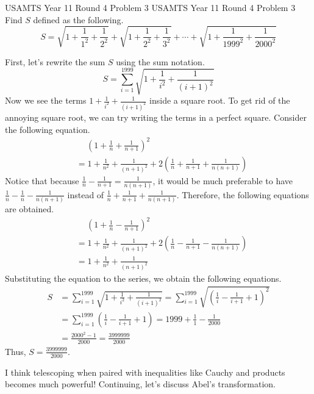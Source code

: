 \documentclass[../../../main.tex]{subfiles}
\begin{document}
\begin{problem}
{USAMTS Year 11 Round 4 Problem 3 \easy}
{USAMTS Year 11 Round 4 Problem 3}
Find $S$ defined as the following.
\[
S
= \sqrt{ 1 + \frac{1}{1^2} + \frac{1}{2^2} }
    + \sqrt{ 1 + \frac{1}{2^2} + \frac{1}{3^2} } + \cdots
    + \sqrt{ 1 + \frac{1}{1999^2} + \frac{1}{2000^2} }
\]
\end{problem}
\begin{solution}
First, let's rewrite the sum $S$ using the sum notation.
\[
S
= \sum_{i=1}^{1999}
    \sqrt{ 1 + \frac{1}{i^2} + \frac{1}{(i + 1)^2} }
\]
Now we see the terms $1 + \frac{1}{i^2} + \frac{1}{(i + 1)^2}$
inside a square root. To get rid of the annoying square root,
we can try writing the terms in a perfect square. Consider the
following equation.
\begin{align*}
    &\quad\ \left( 1 + \frac{1}{n} + \frac{1}{n + 1} \right)^2 \\
    &= 1 + \frac{1}{n^2} + \frac{1}{(n + 1)^2} + 2 \left(
        \frac{1}{n} + \frac{1}{n + 1} + \frac{1}{n(n + 1)}
    \right)
\end{align*}
Notice that because $\frac{1}{n} - \frac{1}{n+1} = \frac{1}{n(n+1)}$,
it would be much preferable to have $\frac{1}{n} - \frac{1}{n}
- \frac{1}{n(n+1)}$ instead of $\frac{1}{n} + \frac{1}{n + 1} +
\frac{1}{n(n + 1)}$. Therefore, the following equations are obtained.
\begin{align*}
    &\quad\ \left( 1 + \frac{1}{n} - \frac{1}{n + 1} \right)^2 \\
    &= 1 + \frac{1}{n^2} + \frac{1}{(n + 1)^2} + 2 \left(
        \frac{1}{n} - \frac{1}{n + 1} - \frac{1}{n(n + 1)}
    \right) \\
    &= 1 + \frac{1}{n^2} + \frac{1}{(n + 1)^2}
\end{align*}
Substituting the equation to the series, we obtain the following
equations.
\begin{align*}
    S
    &= \sum_{i=1}^{1999}
        \sqrt{1 + \frac{1}{i^2} + \frac{1}{(i + 1)^2}}
    = \sum_{i=1}^{1999} \sqrt{\left(
        \frac{1}{i} - \frac{1}{i + 1} + 1
    \right)^2} \\
    &= \sum_{i=1}^{1999}
        \left( \frac{1}{i} - \frac{1}{i + 1} + 1 \right)
    = 1999 + \frac{1}{1} - \frac{1}{2000} \\
    &= \frac{2000^2 - 1}{2000}
    = \frac{3999999}{2000}
\end{align*}
Thus, $S = \frac{3999999}{2000}$.
\end{solution}

I think telescoping when paired with inequalities like Cauchy
and products becomes much powerful! Continuing, let's discuss
Abel's transformation.
\end{document}
